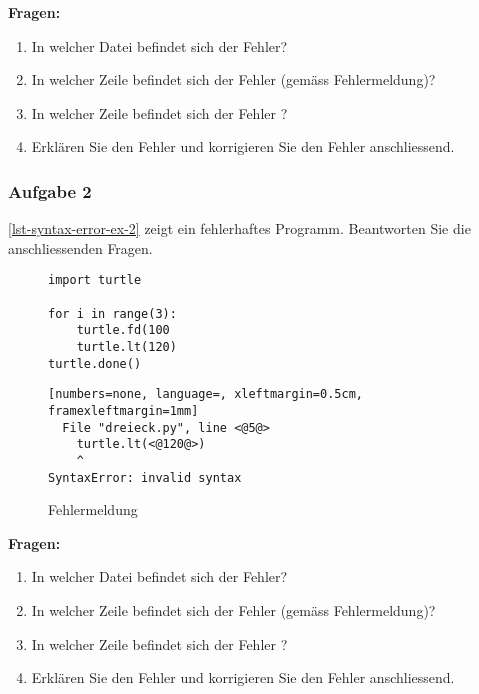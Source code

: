 \textbf{Fragen:}

\begin{enumerate}
\item In welcher Datei befindet sich der Fehler?
\item In welcher Zeile befindet sich der Fehler (gemäss Fehlermeldung)?
\item In welcher Zeile befindet sich der Fehler ?
\item Erklären Sie den Fehler und korrigieren Sie den Fehler anschliessend.
\end{enumerate}

\subsubsection{Aufgabe 2}

\autoref{lst-syntax-error-ex-2} zeigt ein fehlerhaftes Programm. Beantworten Sie die anschliessenden Fragen.

\begin{figure}[htb]
\centering
\begin{minipage}{0.35\linewidth}
\centering
\begin{lstlisting}[caption={Das Programm hat einen Syntaxfehler.}, label=lst-syntax-error-ex-2, showstringspaces=false]
import turtle

for i in range(3):
    turtle.fd(100
    turtle.lt(120)
turtle.done()
\end{lstlisting}
\end{minipage}
\hfill
\begin{minipage}{0.6\linewidth}
\centering
\begin{lstlisting}[numbers=none, language=, xleftmargin=0.5cm, framexleftmargin=1mm]
  File "dreieck.py", line <@5@>
    turtle.lt(<@120@>)
    ^
SyntaxError: invalid syntax
\end{lstlisting}
\caption{Fehlermeldung}
\label{lst-syntax-error-ex-2-output}
\end{minipage}
\end{figure}

\textbf{Fragen:}

\begin{enumerate}
\item In welcher Datei befindet sich der Fehler?
\item In welcher Zeile befindet sich der Fehler (gemäss Fehlermeldung)?
\item In welcher Zeile befindet sich der Fehler ?
\item Erklären Sie den Fehler und korrigieren Sie den Fehler anschliessend.
\end{enumerate}

